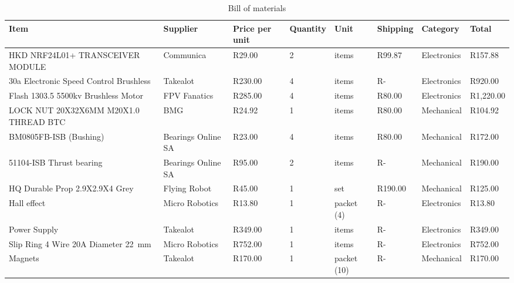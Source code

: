         \normalsize
        \begin{landscape}
            \hspace{5cm}          
            \begin{table}[H]
                \centering
                \scriptsize            
                \caption{Bill of materials}
                \label{tab: bill_of_materials}
                \begin{tabular}{|p{5cm}|l|l|l|l|l|l|l|}
                \hline
                    \textbf{Item} & \textbf{Supplier} & \textbf{Price per unit} & \textbf{Quantity} & \textbf{Unit} &  \textbf{Shipping}  & \textbf{Category} & \textbf{Total} \\ \hline
                    HKD NRF24L01+ TRANSCEIVER MODULE & Communica &  R29.00  & 2 & items &  R99.87  & Electronics &  R157.88  \\ \hline
                    30a Electronic Speed Control Brushless & Takealot &  R230.00  & 4 & items &  R-    & Electronics &  R920.00  \\ \hline
                    Flash 1303.5 5500kv Brushless Motor  & FPV Fanatics &  R285.00  & 4 & items &  R80.00  & Electronics &  R1,220.00  \\ \hline
                    LOCK NUT 20X32X6MM M20X1.0 THREAD BTC & BMG  &  R24.92  & 1 & items &  R80.00  & Mechanical &  R104.92  \\ \hline
                    BM0805FB-ISB (Bushing) & Bearings Online SA &  R23.00  & 4 & items &  R80.00  & Mechanical &  R172.00  \\ \hline
                    51104-ISB Thrust bearing & Bearings Online SA &  R95.00  & 2 & items &  R-    & Mechanical &  R190.00  \\ \hline
                    HQ Durable Prop 2.9X2.9X4 Grey & Flying Robot &  R45.00  & 1 & set &  R190.00  & Mechanical &  R125.00  \\ \hline
                    Hall effect & Micro Robotics &  R13.80  & 1 & packet (4) &  R-    & Electronics &  R13.80  \\ \hline
                    Power Supply & Takealot &  R349.00  & 1 & items &  R-    & Electronics &  R349.00  \\ \hline
                    Slip Ring 4 Wire 20A Diameter 22~mm & Micro Robotics &  R752.00  & 1 & items &  R-    & Electronics &  R752.00  \\ \hline
                    Magnets & Takealot &  R170.00  & 1 & packet (10) &  R-    & Mechanical &  R170.00  \\ \hline

\end{tabular}
\end{table}
\end{landscape}
